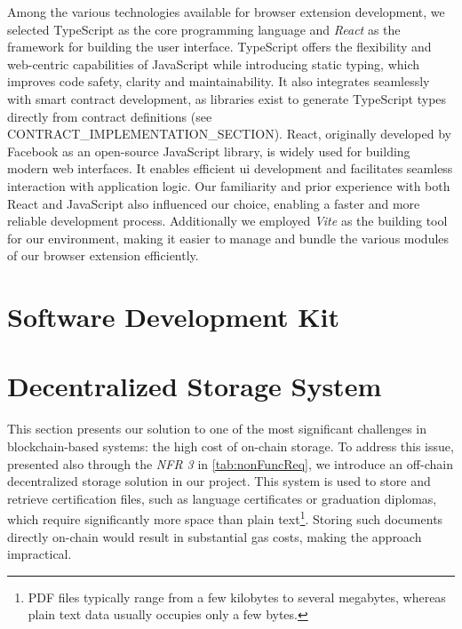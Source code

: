 Among the various technologies available for browser extension development, we selected TypeScript as the core programming language and \textit{React} as the framework for building the user interface. TypeScript offers the flexibility and web-centric capabilities of JavaScript while introducing static typing, which improves code safety, clarity and maintainability. It also integrates seamlessly with smart contract development, as libraries exist to generate TypeScript types directly from contract definitions (see CONTRACT\_IMPLEMENTATION\_SECTION).
React, originally developed by Facebook as an open-source JavaScript library, is widely used for building modern web interfaces. It enables efficient \acrshort{ui} development and facilitates seamless interaction with application logic.
Our familiarity and prior experience with both React and JavaScript also influenced our choice, enabling a faster and more reliable development process. Additionally we employed \textit{Vite} as the building tool for our environment, making it easier to manage and bundle the various modules of our browser extension efficiently.

\section{Software Development Kit}
\label{sec:sdkDesign}

\section{Decentralized Storage System}
\label{sec:decStorageDesgn}
This section presents our solution to one of the most significant challenges in blockchain-based systems: the high cost of on-chain storage. To address this issue, presented also through the \textit{NFR 3} in \cref{tab:nonFuncReq}, we introduce an off-chain decentralized storage solution in our project. This system is used to store and retrieve certification files, such as language certificates or graduation diplomas, which require significantly more space than plain text\footnote{PDF files typically range from a few kilobytes to several megabytes, whereas plain text data usually occupies only a few bytes.}. Storing such documents directly on-chain would result in substantial gas costs, making the approach impractical. 

